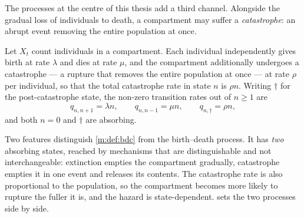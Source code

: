 The processes at the centre of this thesis add a third channel. Alongside the
gradual loss of individuals to death, a compartment may suffer a
\emph{catastrophe}: an abrupt event removing the entire population at once.

\begin{definition}
\label{m:def:bdc}
Let $X_t$ count individuals in a compartment. Each individual independently gives
birth at rate $\lambda$ and dies at rate $\mu$, and the compartment additionally
undergoes a catastrophe --- a rupture that removes the entire population at once
--- at rate $\rho$ per individual, so that the total catastrophe rate in state $n$
is $\rho n$. Writing $\dagger$ for the post-catastrophe state, the non-zero
transition rates out of $n\ge1$ are
\begin{equation}
\label{m:eq:bdcrates}
q_{n,n+1} = \lambda n,
\qquad
q_{n,n-1} = \mu n,
\qquad
q_{n,\dagger} = \rho n ,
\end{equation}
and both $n=0$ and $\dagger$ are absorbing.
\end{definition}

Two features distinguish \cref{m:def:bdc} from the birth--death process. It has
\emph{two} absorbing states, reached by mechanisms that are distinguishable and not
interchangeable: extinction empties the compartment gradually, catastrophe empties
it in one event and releases its contents. The catastrophe rate is also
proportional to the population, so the compartment becomes more likely to rupture
the fuller it is, and the hazard is state-dependent.
 sets the two processes side by side.

